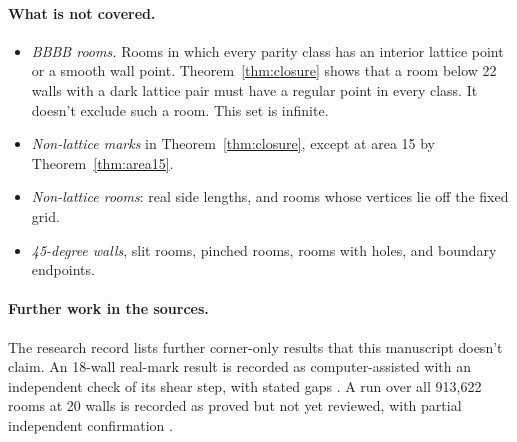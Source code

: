 \documentclass[11pt]{article}
\theoremstyle{definition}
\theoremstyle{remark}
\begin{document}
\paragraph{What is not covered.}
\begin{itemize}
\item \emph{BBBB rooms.} Rooms in which every parity class has an interior
lattice point or a smooth wall point. Theorem~\ref{thm:closure} shows that
a room below 22 walls with a dark lattice pair must have a regular point
in every class. It doesn't exclude such a room. This set is infinite.
\item \emph{Non-lattice marks} in Theorem~\ref{thm:closure}, except at
area 15 by Theorem~\ref{thm:area15}.
\item \emph{Non-lattice rooms}: real side lengths, and rooms whose vertices
lie off the fixed grid.
\item \emph{45-degree walls}, slit rooms, pinched rooms, rooms with holes,
and boundary endpoints.
\end{itemize}

\paragraph{Further work in the sources.}
The research record lists further corner-only results that this
manuscript doesn't claim. An 18-wall real-mark result is recorded as
computer-assisted with an independent check of its shear step, with stated
gaps \cite[\S11]{results}. A run over all 913{,}622 rooms at 20 walls is
recorded as proved but not yet reviewed, with partial independent
confirmation \cite[\S11]{results}.
\end{document}
